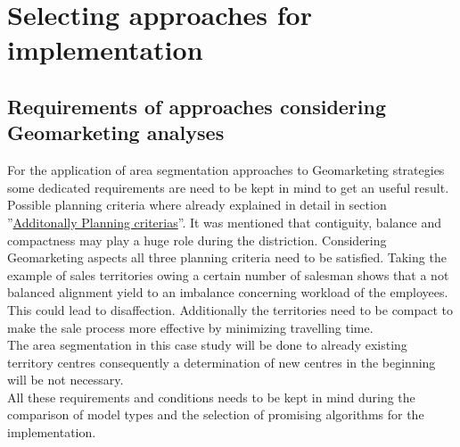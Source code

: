 \section{Selecting approaches for implementation}\label{Selecting}
\subsection{Requirements of approaches considering Geomarketing \newline  analyses}

For the application of area segmentation approaches to Geomarketing strategies some dedicated requirements are need to be kept in mind to get an useful result. Possible planning criteria where already explained in detail in section \label{criterias} ''\hyperref[criterias]{Additonally Planning criterias}''. It was mentioned that contiguity, balance and compactness may play a huge role during the distriction. Considering Geomarketing aspects all three planning criteria need to be satisfied. Taking the example of sales territories owing a certain number of salesman shows that a not balanced alignment yield to an imbalance concerning workload of the employees. This could lead to disaffection. Additionally the territories need to be compact to make the sale process more effective by minimizing travelling time. \\
The area segmentation in this case study will be done to already existing territory centres consequently a determination of new centres in the beginning will be not necessary. \\
All these requirements and conditions needs to be kept in mind during the comparison of model types and the selection of promising algorithms for the implementation.



